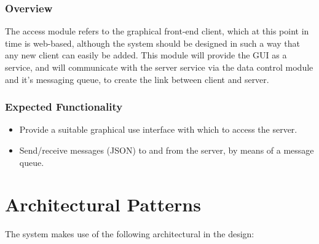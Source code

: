 \documentclass[12pt]{article}
\begin{document}
		\subsubsection{Overview}
		
		The access module refers to the graphical front-end client, which at this point in time is web-based, although the system should be designed in such a way that any new client can easily be added. This module will provide the GUI as a service, and will communicate with the server service via the data control module and it's messaging queue, to create the link between client and server.
		
		\subsubsection{Expected Functionality}
		
		\begin{itemize}
			\item Provide a suitable graphical use interface with which to access the server.
			\item Send/receive messages (JSON) to and from the server, by means of a message queue. 
		\end{itemize}
	
	\pagebreak

\section{Architectural  Patterns}

The system makes use of the following architectural in the design:
\end{document}
